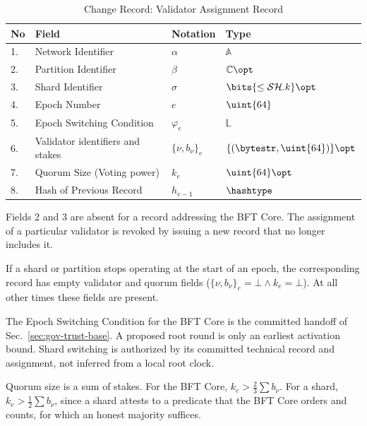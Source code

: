 \begin{table}[!htbp]
	\begin{center}
		\caption{Change Record: Validator Assignment Record}\label{ta:var}
		\begin{tabular}{|p{0.5cm}|p{8cm}|p{1.7cm}|p{3.5cm}|}\hline
			No & Field                      & Notation      & Type                        \\\hline\hline
			1. & Network Identifier         & $\alpha$      & $\mathbb{A}$                \\\hline
			2. & Partition Identifier       & $\beta$       & $\mathbb{C}\opt$            \\\hline
			3. & Shard Identifier           & $\sigma$      & $\bits{\le \mathcal{SH}.k}\opt$ \\\hline
			4. & Epoch Number               & $e$           & $\uint{64}$                 \\\hline
			5. & Epoch Switching Condition  & $\varphi_e$   & $\mathbb{L}$               \\\hline
			6. & Validator identifiers and stakes& $\{\nu, b_\nu\}_e$ & $\{ (\bytestr, \uint{64}) \} \opt$ \\\hline
			7. & Quorum Size (Voting power) & $k_e$         & $\uint{64} \opt$                 \\\hline
			8. & Hash of Previous Record    & $h_{e-1}$     & $\hashtype$                \\\hline
		\end{tabular}
	\end{center}
\end{table}

Fields 2 and 3 are absent for a record addressing the BFT Core. The assignment of a particular validator is revoked by issuing a new record that no longer includes it.

If a shard or partition stops operating at the start of an epoch, the corresponding record has empty validator and quorum fields ($\{\nu, b_\nu\}_e = \bot \land k_e = \bot$). At all other times these fields are present.

The Epoch Switching Condition for the BFT Core is the committed handoff of Sec.~\ref{sec:gov-trust-base}. A proposed root round is only an earliest activation bound. Shard switching is authorized by its committed technical record and assignment, not inferred from a local root clock.

Quorum size is a sum of stakes. For the BFT Core, $k_e > \tfrac{2}{3}\sum b_\nu$. For a shard, $k_e > \tfrac{1}{2}\sum b_\nu$, since a shard attests to a predicate that the BFT Core orders and counts, for which an honest majority suffices.

